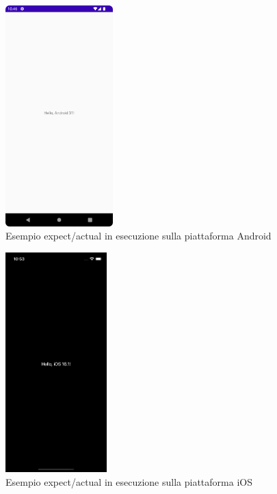 \begin{multicols}{2}
    \begin{figure}[H]
        \includegraphics[width=0.37\textwidth]{img/kmm_example_android.png}
        \caption{Esempio expect/actual in esecuzione sulla piattaforma Android}
        \label{expect-actual-android}
    \end{figure}

    \begin{figure}[H]
        \includegraphics[width=0.35\textwidth]{img/kmm_example_ios_dark.png}
        \caption{Esempio expect/actual in esecuzione sulla piattaforma iOS}
        \label{expect-actual-ios}
    \end{figure}
\end{multicols}

